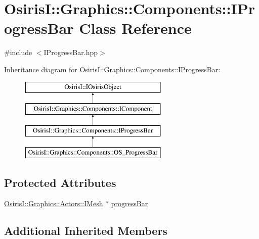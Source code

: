 \hypertarget{class_osiris_i_1_1_graphics_1_1_components_1_1_i_progress_bar}{\section{Osiris\-I\-:\-:Graphics\-:\-:Components\-:\-:I\-Progress\-Bar Class Reference}
\label{class_osiris_i_1_1_graphics_1_1_components_1_1_i_progress_bar}
}


{\ttfamily \#include $<$I\-Progress\-Bar.\-hpp$>$}

Inheritance diagram for Osiris\-I\-:\-:Graphics\-:\-:Components\-:\-:I\-Progress\-Bar\-:\begin{figure}[H]
\begin{center}
\leavevmode
\includegraphics[height=4.000000cm]{class_osiris_i_1_1_graphics_1_1_components_1_1_i_progress_bar}
\end{center}
\end{figure}
\subsection*{Protected Attributes}
\begin{DoxyCompactItemize}
\item 
\hyperlink{class_osiris_i_1_1_graphics_1_1_actors_1_1_i_mesh}{Osiris\-I\-::\-Graphics\-::\-Actors\-::\-I\-Mesh} $\ast$ \hyperlink{class_osiris_i_1_1_graphics_1_1_components_1_1_i_progress_bar_a9ba973599ca82442d2933036399a2f2e}{progress\-Bar}
\end{DoxyCompactItemize}
\subsection*{Additional Inherited Members}


